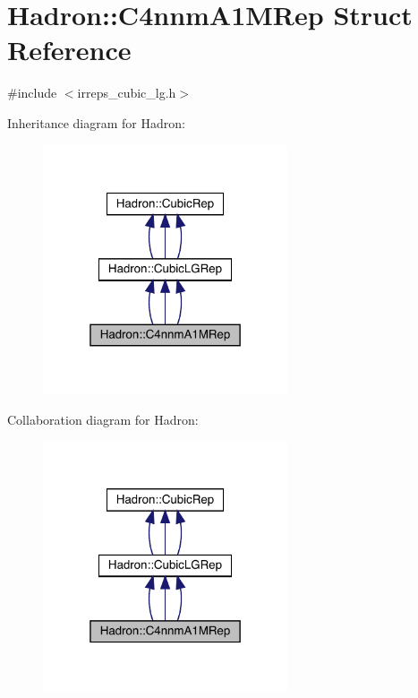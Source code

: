 \hypertarget{structHadron_1_1C4nnmA1MRep}{}\section{Hadron\+:\+:C4nnm\+A1\+M\+Rep Struct Reference}
\label{structHadron_1_1C4nnmA1MRep}


{\ttfamily \#include $<$irreps\+\_\+cubic\+\_\+lg.\+h$>$}



Inheritance diagram for Hadron\+:
\nopagebreak
\begin{figure}[H]
\begin{center}
\leavevmode
\includegraphics[width=205pt]{df/d6e/structHadron_1_1C4nnmA1MRep__inherit__graph}
\end{center}
\end{figure}


Collaboration diagram for Hadron\+:
\nopagebreak
\begin{figure}[H]
\begin{center}
\leavevmode
\includegraphics[width=205pt]{dc/df5/structHadron_1_1C4nnmA1MRep__coll__graph}
\end{center}
\end{figure}
